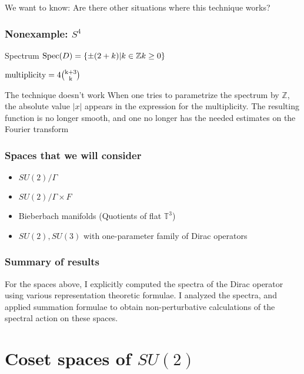 \documentclass{beamer}
\def\Z{{\mathbb Z}}
\def\Spec{{\rm Spec}}
\begin{document}
\begin{frame}
  \begin{block}{}
  We want to know: Are there other situations where this technique works?
  \end{block}
\end{frame}

\begin{frame}
  \frametitle{Nonexample: $S^4$}
  \begin{block}{Spectrum}
    $\Spec(D) = \{\pm (2 + k) | k \in \Z k \geq 0 \}$

    $\rm{multiplicity} = 4 {{k+3} \choose {k}}$
  \end{block}

  \pause

  \begin{alertblock}{The technique doesn't work}
    When one tries to parametrize the spectrum by $\Z$, the absolute value $|x|$ appears in the expression for the multiplicity. The resulting function is no longer smooth, and one no longer has the needed estimates on the Fourier transform
  \end{alertblock}
\end{frame}

\begin{frame}
  \frametitle{Spaces that we will consider}
  \begin{itemize}
    \item $SU(2)/\Gamma$
    \item $SU(2)/\Gamma \times F$
    \item Bieberbach manifolds (Quotients of flat $\mathbb{T} ^3$)
    \item $SU(2), SU(3)$ with one-parameter family of Dirac operators
  \end{itemize}
\end{frame}

\begin{frame}
	\frametitle{Summary of results}
For the spaces above, I explicitly computed the spectra of the Dirac operator using various representation theoretic formulae. I analyzed the spectra, and applied summation formulae to obtain non-perturbative calculations of the spectral action on these spaces.
\end{frame}

\section{Coset spaces of $SU(2)$}
\end{document}
